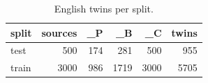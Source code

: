 \begin{table}[t]
\centering
\caption{English twins per split.}
\label{tab:tab_twins}
\begin{tabular}{lrrrrr}
\toprule
split & sources & \_P & \_B & \_C & twins \\
\midrule
test & 500 & 174 & 281 & 500 & 955 \\
train & 3000 & 986 & 1719 & 3000 & 5705 \\
\bottomrule
\end{tabular}
\end{table}
